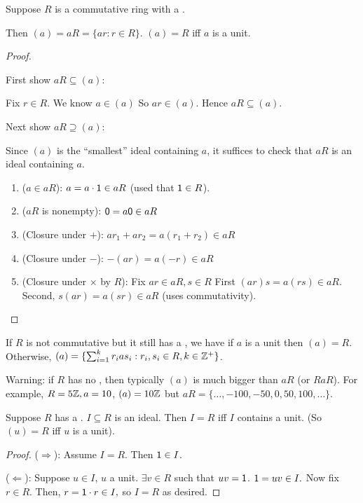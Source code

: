 \documentclass[notes.tex]{subfiles}
\begin{document}
\begin{proposition}
	Suppose $R$ is a commutative ring with a \one.

	Then $(a) = aR = \{ar : r\in R\}$. $(a) = R$ iff $a$ is a unit.
\end{proposition}
\begin{proof}
	\begin{tabin}
		First show $aR \subseteq (a)$:
	\end{tabin}
	Fix $r\in R$. We know $a\in (a)$ So $ar\in (a)$. Hence $aR \subseteq (a)$.
	\begin{tabin}
		Next show $aR\supseteq (a)$:
	\end{tabin}
	Since $(a)$ is the ``smallest'' ideal containing $a$, it suffices to check that $aR$ is an ideal containing $a$.
	\begin{enumerate}
		\item ($a\in aR$): $a=a\cdot \mathsf{1} \in aR$ (used that $\mathsf{1} \in R$).
		\item ($aR$ is nonempty): $\mathsf{0} = a\mathsf{0} \in aR$
		\item (Closure under $+$): $ar_1 + ar_2 = a(r_1 + r_2) \in aR$
		\item (Closure under $-$): $-(ar) = a(-r) \in aR$
		\item (Closure under $\times$ by $R$): Fix $ar\in aR, s\in R$
		First $(ar)s = a(rs) \in aR$. Second, $s(ar) = a(sr) \in aR$ (uses commutativity).
	\end{enumerate}
\end{proof}
\begin{remark}
	If $R$ is not commutative but it still has a \one, we have if $a$ is a unit then $(a) = R$. Otherwise, $(a) = \{\sum_{i=1}^kr_ias_i : r_i, s_i\in R, k\in \mathbb{Z}^+\}$.
\end{remark}
\begin{remark}
	Warning: if $R$ has no \one, then typically $(a)$ is much bigger than $aR$ (or $RaR$).
	For example, $R = 5\mathbb{Z}, a=10$, $(a) = 10\mathbb{Z}$ but $aR = \{\ldots, -100, -50, 0, 50, 100, \ldots\}$.
\end{remark}

\begin{proposition}
	\label{prop:unitideal}
	Suppose $R$ has a \one. $I\subseteq R$ is an ideal. Then $I=R$ iff $I$ contains a unit.
	(So $(u) = R$ iff $u$ is a unit).
\end{proposition}
\begin{proof}
($\Longrightarrow$): Assume $I=R$. Then $\mathsf{1} \in I$.

($\Longleftarrow$): Suppose $u\in I$, $u$ a unit. $\exists v\in R$ such that $uv =\mathsf{1}$. $\mathsf{1} = uv \in I.$ Now fix $r\in R$. Then, $r = \mathsf{1}\cdot r\in I,$ so $I=R$ as desired.
\end{proof}
\end{document}
